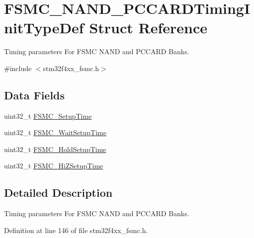 \hypertarget{struct_f_s_m_c___n_a_n_d___p_c_c_a_r_d_timing_init_type_def}{\section{F\-S\-M\-C\-\_\-\-N\-A\-N\-D\-\_\-\-P\-C\-C\-A\-R\-D\-Timing\-Init\-Type\-Def Struct Reference}
\label{struct_f_s_m_c___n_a_n_d___p_c_c_a_r_d_timing_init_type_def}
}


Timing parameters For F\-S\-M\-C N\-A\-N\-D and P\-C\-C\-A\-R\-D Banks.  




{\ttfamily \#include $<$stm32f4xx\-\_\-fsmc.\-h$>$}

\subsection*{Data Fields}
\begin{DoxyCompactItemize}
\item 
uint32\-\_\-t \hyperlink{struct_f_s_m_c___n_a_n_d___p_c_c_a_r_d_timing_init_type_def_a3b0b076d6c5cae5a023aba6d74ffb1b7}{F\-S\-M\-C\-\_\-\-Setup\-Time}
\item 
uint32\-\_\-t \hyperlink{struct_f_s_m_c___n_a_n_d___p_c_c_a_r_d_timing_init_type_def_abf4f8b523317ce9a2e079c2b5ac1d857}{F\-S\-M\-C\-\_\-\-Wait\-Setup\-Time}
\item 
uint32\-\_\-t \hyperlink{struct_f_s_m_c___n_a_n_d___p_c_c_a_r_d_timing_init_type_def_a9830626a2ab6b45fa384adbc5c55eb69}{F\-S\-M\-C\-\_\-\-Hold\-Setup\-Time}
\item 
uint32\-\_\-t \hyperlink{struct_f_s_m_c___n_a_n_d___p_c_c_a_r_d_timing_init_type_def_ae39ab3cbe94c85c5614018cd0fc40094}{F\-S\-M\-C\-\_\-\-Hi\-Z\-Setup\-Time}
\end{DoxyCompactItemize}


\subsection{Detailed Description}
Timing parameters For F\-S\-M\-C N\-A\-N\-D and P\-C\-C\-A\-R\-D Banks. 

Definition at line 146 of file stm32f4xx\-\_\-fsmc.\-h.



